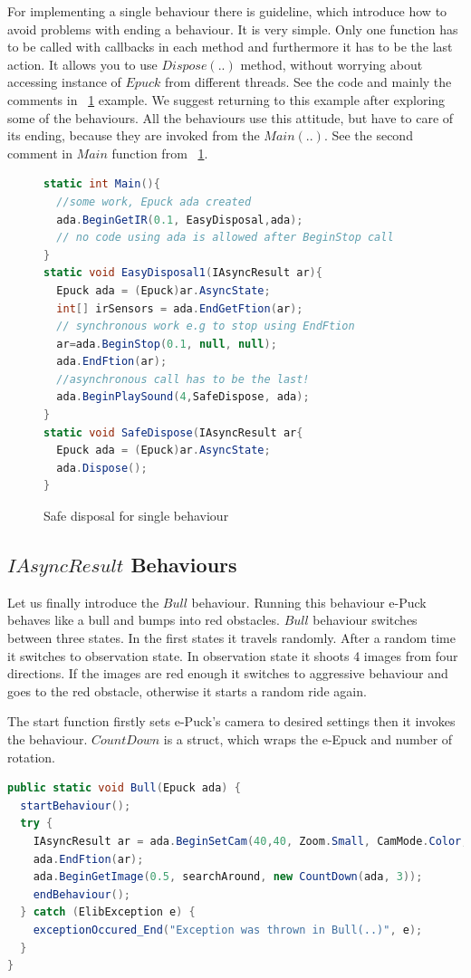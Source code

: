   For implementing a single behaviour there is guideline, which introduce how to avoid problems with ending a behaviour.
  It is very simple. Only one function has to be called  with callbacks in each method and 
  furthermore it has to be the last action. It allows you to use $Dispose(..)$ method, 
  without worrying about accessing instance of $Epuck$  from different threads.
  See the code and mainly the comments in ~\ref{safedis} example. 
  We suggest returning to this example after exploring some of the behaviours.
  All the behaviours use this attitude, but have to care of its ending, because they are invoked from the $Main(..)$. 
  See the second comment in $Main$ function from ~\ref{safedis}.
\begin{figure}[!hbp]	
\begin{lstlisting}[language=cs]
static int Main(){
  //some work, Epuck ada created
  ada.BeginGetIR(0.1, EasyDisposal,ada);
  // no code using ada is allowed after BeginStop call
}
static void EasyDisposal1(IAsyncResult ar){
  Epuck ada = (Epuck)ar.AsyncState;
  int[] irSensors = ada.EndGetFtion(ar);
  // synchronous work e.g to stop using EndFtion
  ar=ada.BeginStop(0.1, null, null);
  ada.EndFtion(ar);
  //asynchronous call has to be the last!
  ada.BeginPlaySound(4,SafeDispose, ada);
}
static void SafeDispose(IAsyncResult ar{
  Epuck ada = (Epuck)ar.AsyncState;
  ada.Dispose();
}
\end{lstlisting}
\caption{Safe disposal for single behaviour} \label{safedis}
\end{figure}

\subsection{$IAsyncResult$ Behaviours}\label{sec:iabehaviors}\label{sec:bull}
  Let us finally introduce the $Bull$ behaviour.
  Running this behaviour e-Puck behaves like a bull and bumps into red obstacles.
  $Bull$ behaviour switches between three states. In the first states it travels randomly. 
  After a random time it switches to observation state.
  In observation state it shoots 4 images from four directions. If the images are red enough 
  it switches to aggressive behaviour and goes to the red obstacle,
  otherwise it starts a random ride again.

  
  The start function firstly sets e-Puck's camera to desired settings then it invokes the behaviour.
  $CountDown$ is a struct, which wraps the e-Epuck and number of rotation.

\begin{lstlisting}[language=cs]
public static void Bull(Epuck ada) {
  startBehaviour();
  try {
    IAsyncResult ar = ada.BeginSetCam(40,40, Zoom.Small, CamMode.Color, toSetCam, null, null);
    ada.EndFtion(ar);
    ada.BeginGetImage(0.5, searchAround, new CountDown(ada, 3));
    endBehaviour();
  } catch (ElibException e) {
    exceptionOccured_End("Exception was thrown in Bull(..)", e);
  }
}
\end{lstlisting}
  
